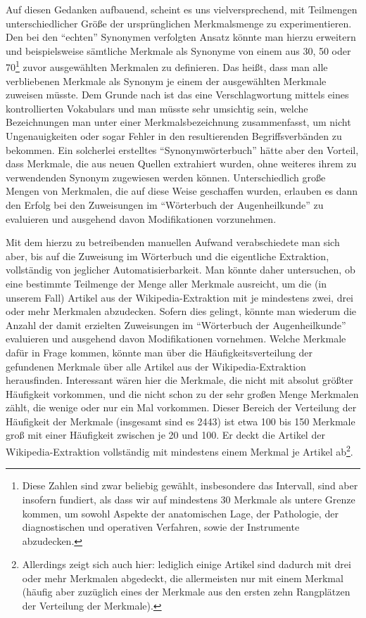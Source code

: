 \documentclass[pagesize,paper=A4,DIV=calc,fontsize=12pt,draft=false]{scrreprt}
\begin{document}
Auf diesen Gedanken aufbauend, scheint es uns vielversprechend, mit Teilmengen unterschiedlicher Größe der ursprünglichen Merkmalsmenge zu experimentieren.
Den bei den \enquote{echten} Synonymen verfolgten Ansatz könnte man hierzu erweitern und beispielsweise sämtliche Merkmale als Synonyme von einem aus 30, 50 oder 70\footnote{Diese Zahlen sind zwar beliebig gewählt, insbesondere das Intervall, sind aber insofern fundiert, als dass wir auf mindestens 30 Merkmale als untere Grenze kommen, um sowohl Aspekte der anatomischen Lage, der Pathologie, der diagnostischen und operativen Verfahren, sowie der Instrumente abzudecken.} zuvor ausgewählten Merkmalen zu definieren.
Das heißt, dass man alle verbliebenen Merkmale als Synonym je einem der ausgewählten Merkmale zuweisen müsste.
Dem Grunde nach ist das eine Verschlagwortung mittels eines kontrollierten Vokabulars und man müsste sehr umsichtig sein, welche Bezeichnungen man unter einer Merkmalsbezeichnung zusammenfasst, um nicht Ungenauigkeiten oder sogar Fehler in den resultierenden Begriffsverbänden zu bekommen.
Ein solcherlei erstelltes \enquote{Synonymwörterbuch} hätte aber den Vorteil, dass Merkmale, die aus neuen Quellen extrahiert wurden, ohne weiteres ihrem zu verwendenden Synonym zugewiesen werden können.
Unterschiedlich große Mengen von Merkmalen, die auf diese Weise geschaffen wurden, erlauben es dann den Erfolg bei den Zuweisungen im \enquote{Wörterbuch der Augenheilkunde} zu evaluieren und ausgehend davon Modifikationen vorzunehmen.

Mit dem hierzu zu betreibenden manuellen Aufwand verabschiedete man sich aber, bis auf die Zuweisung im Wörterbuch und die eigentliche Extraktion, vollständig von jeglicher Automatisierbarkeit.
Man könnte daher untersuchen, ob eine bestimmte Teilmenge der Menge aller Merkmale ausreicht, um die (in unserem Fall) Artikel aus der Wikipedia-Extraktion mit je mindestens zwei, drei oder mehr Merkmalen abzudecken.
Sofern dies gelingt, könnte man wiederum die Anzahl der damit erzielten Zuweisungen im \enquote{Wörterbuch der Augenheilkunde} evaluieren und ausgehend davon Modifikationen vornehmen.
Welche Merkmale dafür in Frage kommen, könnte man über die Häufigkeitsverteilung der gefundenen Merkmale über alle Artikel aus der Wikipedia-Extraktion herausfinden.
Interessant wären hier die Merkmale, die nicht mit absolut größter Häufigkeit vorkommen, und die nicht schon zu der sehr großen Menge Merkmalen zählt, die wenige oder nur ein Mal vorkommen.
Dieser Bereich der Verteilung der Häufigkeit der Merkmale (insgesamt sind es 2443) ist etwa 100 bis 150 Merkmale groß mit einer Häufigkeit zwischen je 20 und 100.
Er deckt die Artikel der Wikipedia-Extraktion vollständig mit mindestens einem Merkmal je Artikel ab\footnote{Allerdings zeigt sich auch hier: lediglich einige Artikel sind dadurch mit drei oder mehr Merkmalen abgedeckt, die allermeisten nur mit einem Merkmal (häufig aber zuzüglich eines der Merkmale aus den ersten zehn Rangplätzen der Verteilung der Merkmale).}.
\end{document}
